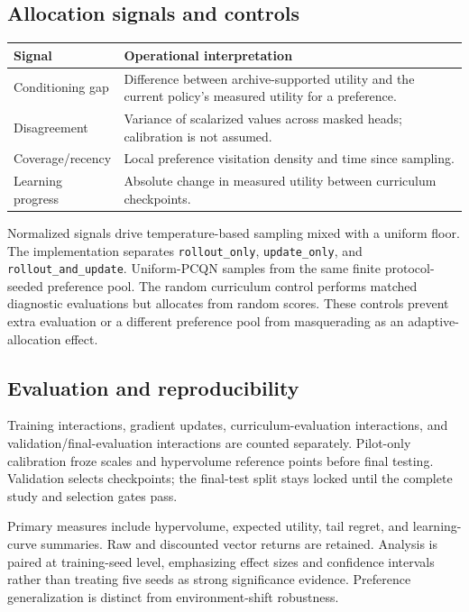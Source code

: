 \subsection{Allocation signals and controls}
\begin{tabularx}{\textwidth}{@{}p{36mm}Y@{}}
\toprule
\textbf{Signal} & \textbf{Operational interpretation} \\
\midrule
Conditioning gap & Difference between archive-supported utility and the
current policy's measured utility for a preference. \\
Disagreement & Variance of scalarized values across masked heads; calibration
is not assumed. \\
Coverage/recency & Local preference visitation density and time since sampling. \\
Learning progress & Absolute change in measured utility between curriculum checkpoints. \\
\bottomrule
\end{tabularx}

Normalized signals drive temperature-based sampling mixed with a uniform floor.
The implementation separates \texttt{rollout\_only}, \texttt{update\_only}, and
\texttt{rollout\_and\_update}. Uniform-PCQN samples from the same finite
protocol-seeded preference pool. The random curriculum control performs matched
diagnostic evaluations but allocates from random scores. These controls prevent
extra evaluation or a different preference pool from masquerading as an
adaptive-allocation effect.

\subsection{Evaluation and reproducibility}
Training interactions, gradient updates, curriculum-evaluation interactions,
and validation/final-evaluation interactions are counted separately. Pilot-only
calibration froze scales and hypervolume reference points before final testing.
Validation selects checkpoints; the final-test split stays locked until the
complete study and selection gates pass.

Primary measures include hypervolume, expected utility, tail regret, and
learning-curve summaries. Raw and discounted vector returns are retained.
Analysis is paired at training-seed level, emphasizing effect sizes and
confidence intervals rather than treating five seeds as strong significance
evidence. Preference generalization is distinct from environment-shift robustness.

